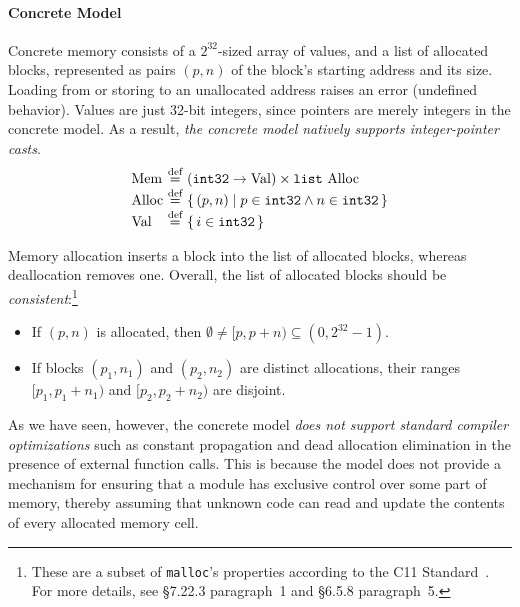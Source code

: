 

\paragraph{Concrete Model}


Concrete memory consists of a $2^{32}$-sized array of values, and a
list of allocated blocks, 
represented as pairs $(p,n)$ of the block's starting address and its size.
Loading from or storing to an unallocated address raises
an error (\ie undefined behavior).  Values are just 32-bit integers,
since pointers are merely integers in the concrete model.
As a result, \emph{the concrete model natively supports integer-pointer casts}.
\[
\begin{array}{@{}l@{~}c@{~}l@{}}
\mathrm{Mem} &\defeq& (\inttype \to \mathrm{Val}) \times \mathtt{list}\ \mathrm{Alloc} \\
\mathrm{Alloc} &\defeq& \setof{(p,n) \suchthat p \in \inttype \land n \in \inttype} \\
\mathrm{Val} &\defeq& \setof{i\in\inttype}
\end{array}
\]

Memory allocation inserts a block into the list of allocated blocks, 
whereas deallocation removes one.  Overall, the list of allocated 
blocks should be \emph{consistent}:\footnote{These are a subset of 
  \texttt{malloc}'s properties according to the C11 Standard~\cite{iso2011iec}. 
  For more details, see \S7.22.3 paragraph~1 and \S6.5.8 paragraph~5.}
\begin{itemize}
\item If $(p, n)$ is allocated, then $\emptyset \neq [p,p+n) \subseteq
  (0,2^{32}-1)$.
\item If blocks $(p_1, n_1)$ and $(p_2, n_2)$ are distinct
  allocations, their ranges $[p_1,p_1+n_1)$ and $[p_2,p_2+n_2)$
  are disjoint.
\end{itemize}

As we have seen, however, the concrete model \emph{does not support 
standard compiler optimizations} such as constant propagation and 
dead allocation elimination in the presence of external function
calls.  This is because the model does not provide 
a mechanism for ensuring that a module has exclusive control over some
part of memory, thereby assuming that unknown code can read and 
update the contents of every allocated memory cell.


